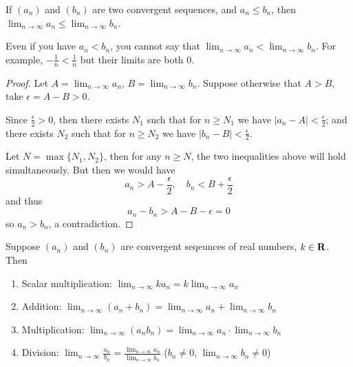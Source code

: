 \begin{lemma}
If $(a_n)$ and $(b_n)$ are two convergent sequences, and $a_n \le b_n$, then $\displaystyle\lim_{n\to\infty}a_n\le\lim_{n\to\infty}b_n$.
\end{lemma}

\begin{remark}
Even if you have $a_n<b_n$, you cannot say that $\displaystyle\lim_{n\to\infty}a_n<\lim_{n\to\infty}b_n$. For example, $-\frac{1}{n}<\frac{1}{n}$ but their limits are both $0$.
\end{remark}

\begin{proof}
Let $\displaystyle A=\lim_{n\to\infty}a_n$, $\displaystyle B=\lim_{n\to\infty}b_n$. Suppose otherwise that $A>B$, take $\epsilon=A-B>0$.

Since $\frac{\epsilon}{2}>0$, then there exists $N_1$ such that for $n\ge N_1$ we have $|a_n-A|<\frac{\epsilon}{2}$; and there exists $N_2$ such that for $n\ge N_2$ we have $|b_n-B|<\frac{\epsilon}{2}$.

Let $N=\max\{N_1,N_2\}$, then for any $n\ge N$, the two inequalities above will hold simultaneously. But then we would have
\[a_n>A-\frac{\epsilon}{2},\quad b_n<B+\frac{\epsilon}{2}\]
and thus
\[a_n-b_n>A-B-\epsilon=0\]
so $a_n>b_n$, a contradiction.
\end{proof}

\begin{proposition}
Suppose $(a_n)$ and $(b_n)$ are convergent seqeunces of real numbers, $k\in\mathbf R$. Then
\begin{enumerate}[label=(\arabic*)]
\item Scalar multiplication: $\displaystyle\lim_{n\to\infty} ka_n=k\lim_{n\to\infty}a_n$
\item Addition: $\displaystyle\lim_{n\to\infty}(a_n+b_n)=\lim_{n\to\infty}a_n+\lim_{n\to\infty}b_n$
\item Multiplication: $\displaystyle\lim_{n\to\infty}(a_n b_n)=\lim_{n\to\infty}a_n\cdot\lim_{n\to\infty}b_n$
\item Division: $\displaystyle\lim_{n\to\infty}\frac{a_n}{b_n}=\frac{\lim_{n\to\infty} a_n}{\lim_{n\to\infty} b_n}$ ($b_n\neq0$, $\displaystyle\lim_{n\to\infty}b_n\neq0$)
\end{enumerate}
\end{proposition}

